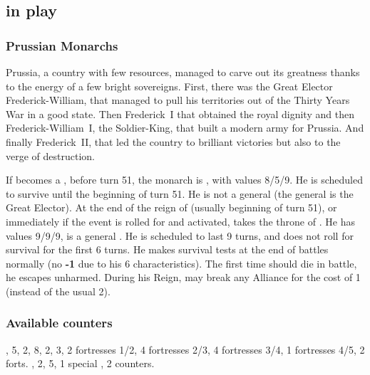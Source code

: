 \subsection{ in play}
\subsubsection{Prussian Monarchs}
\begin{histoire}
  Prussia, a country with few resources, managed to carve out its
  greatness thanks to the energy of a few bright sovereigns. First,
  there was the Great Elector Frederick-William, that managed to pull
  his territories out of the Thirty Years War in a good state. Then
  Frederick~I that obtained the royal dignity and then
  Frederick-William~I, the Soldier-King, that built a modern army for
  Prussia. And finally Frederick~II, that led the country to brilliant
  victories but also to the verge of destruction.
\end{histoire}
 If \PRU becomes a \MAJ,
before turn 51, the monarch is , with values
8/5/9. He is scheduled to survive until the beginning of turn 51. He is
not a general (the  general is the Great
Elector).
 At the end of the reign of
 (usually beginning of turn 51), or
immediately if the event  is rolled for
and activated,  takes the throne of
. He has values 9/9/9, is a general
. He is scheduled to last 9 turns, and does
not roll for survival for the first 6 turns.
\bparag He makes survival tests at the end of battles normally (no {\bf
  -1} due to his 6 characteristics).
 The first time 
should die in battle, he escapes unharmed.
\bparag During his Reign,  may break any Alliance for
the cost of 1 \STAB (instead of the usual 2).

\subsubsection{Available counters}
\ARMY, 5\FLEET, 2\LDND, 8\LD, 2\NTD, 3\LDENDE, 2
fortresses 1/2, 4 fortresses 2/3, 4 fortresses 3/4, 1 fortresses 4/5, 2
forts.
\COL, 2\TP, 5\MNU, 1 special \MNU, 2\TradeFLEET
counters.

